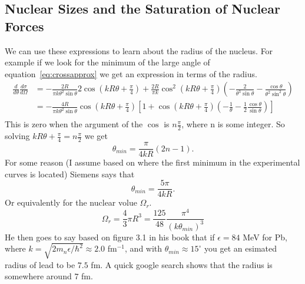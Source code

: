 \documentclass[12pt]{extarticle}
\begin{document}
\subsection*{Nuclear Sizes and the Saturation of Nuclear Forces}
We can use these expressions to learn about the radius of the nucleus. For example if we look for the minimum of the large angle of equation~\ref{eq:crossapprox} we get an expression in terms of the radius.
\begin{align}
   \frac{d}{d\theta}\frac{d\sigma}{d\Omega} &= -\frac{2R}{\pi k\theta^2\sin\theta}2\cos\left(kR\theta+\frac{\pi}{4}\right) + \frac{2R}{\pi k}\cos^2\left(kR\theta+\frac{\pi}{4}\right)\left(-\frac{2}{\theta^3\sin\theta}-\frac{\cos\theta}{\theta^2\sin^2\theta}\right) \\
   &= -\frac{4R}{\pi k\theta^2\sin\theta}\cos\left(kR\theta+\frac{\pi}{4}\right) \left[1 + \cos\left(kR\theta+\frac{\pi}{4}\right)\left(-\frac{1}{\theta}-\frac{1}{2}\frac{\cos\theta}{\sin\theta}\right)\right] \\
\end{align}
This is zero when the argument of the $\cos$ is $n\frac{\pi}{2}$, where n is some integer. So solving $kR\theta+\frac{\pi}{4} = n\frac{\pi}{2}$ we get
\begin{equation}
   \theta_{min} = \frac{\pi}{4kR}(2n-1).
\end{equation}
For some reason (I assume based on where the first minimum in the experimental curves is located) Siemens says that
\begin{equation}
   \boxed{ \theta_{min} = \frac{5\pi}{4kR} }.
\end{equation}
Or equivalently for the nuclear volue $\Omega_r$.
\begin{equation}
   \Omega_r = \frac{4}{3}\pi R^3 = \frac{125}{48}\frac{\pi^4}{(k\theta_{min})^3}
\end{equation}
He then goes to say based on figure 3.1 in his book that if $\epsilon = 84$ MeV for Pb, where $k = \sqrt{2m_n\epsilon/\hbar^2} \approx 2.0$ fm$^{-1}$, and with $\theta_{min} \approx 15^\circ$ you get an esimated radius of lead to be $7.5$ fm. A quick google search shows that the radius is somewhere around $7$ fm.
\end{document}
